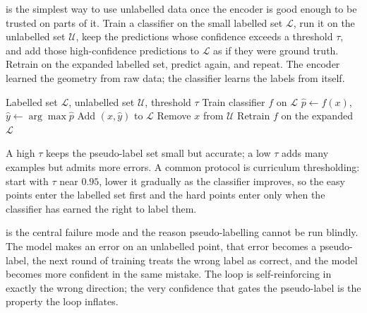 
 is the simplest way to use unlabelled data once the encoder is good enough to be trusted on parts of it.
Train a classifier on the small labelled set $\mathcal{L}$, run it on the unlabelled set $\mathcal{U}$, keep the predictions whose confidence exceeds a threshold $\tau$, and add those high-confidence predictions to $\mathcal{L}$ as if they were ground truth.
Retrain on the expanded labelled set, predict again, and repeat.
The encoder learned the geometry from raw data; the classifier learns the labels from itself.

\vspace{1.5em}

\begin{algorithm}[H]
\caption{Pseudo-Labelling with Confidence Thresholding}
\begin{algorithmic}[1]
\Require Labelled set $\mathcal{L}$, unlabelled set $\mathcal{U}$, threshold $\tau$
\State Train classifier $f$ on $\mathcal{L}$
\Repeat
        \State $\hat{p} \gets f(x)$, $\hat{y} \gets \arg\max \hat{p}$
            \State Add $(x, \hat{y})$ to $\mathcal{L}$
            \State Remove $x$ from $\mathcal{U}$
        \EndIf
    \EndFor
    \State Retrain $f$ on the expanded $\mathcal{L}$
\end{algorithmic}
\end{algorithm}

A high $\tau$ keeps the pseudo-label set small but accurate; a low $\tau$ adds many examples but admits more errors.
A common protocol is curriculum thresholding: start with $\tau$ near $0.95$, lower it gradually as the classifier improves, so the easy points enter the labelled set first and the hard points enter only when the classifier has earned the right to label them.

 is the central failure mode and the reason pseudo-labelling cannot be run blindly.
The model makes an error on an unlabelled point, that error becomes a pseudo-label, the next round of training treats the wrong label as correct, and the model becomes more confident in the same mistake.
The loop is self-reinforcing in exactly the wrong direction; the very confidence that gates the pseudo-label is the property the loop inflates.

